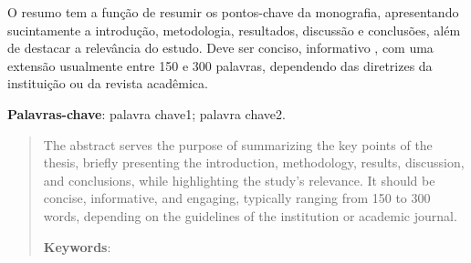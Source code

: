 

{\fontsize{12pt}{12pt}\selectfont %
\renewcommand{\resumoname}{\textbf{\fontsize{12pt}{12pt}\selectfont RESUMO}} %

\begin{resumo}
   \noindent 
O resumo tem a função de resumir os pontos-chave da monografia, apresentando sucintamente a introdução, metodologia, resultados, discussão e conclusões, além de destacar a relevância do estudo. Deve ser conciso, informativo , com uma extensão usualmente entre 150 e 300 palavras, dependendo das diretrizes da instituição ou da revista acadêmica.

    \textbf{Palavras-chave}: palavra chave1; palavra chave2.
\end{resumo}
}
\newpage


{\fontsize{12pt}{12pt}\selectfont %
\renewcommand{\abstractname}{\textbf{\fontsize{12pt}{12pt}\selectfont ABSTRACT}} %

\begin{abstract}
    \noindent
The abstract serves the purpose of summarizing the key points of the thesis, briefly presenting the introduction, methodology, results, discussion, and conclusions, while highlighting the study's relevance. It should be concise, informative, and engaging, typically ranging from 150 to 300 words, depending on the guidelines of the institution or academic journal.
    
    \textbf{Keywords}:
\end{abstract}
}
\newpage
